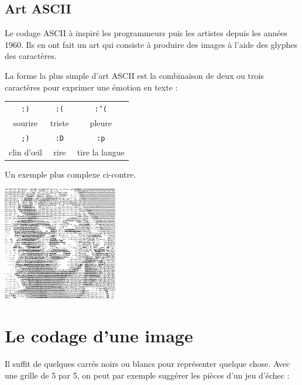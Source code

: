\documentclass[a4paper,10pt]{report}
\theoremstyle{exo}
\theoremstyle{exercice}
\begin{document}
\subsection{Art ASCII}
Le codage ASCII à inspiré les programmeurs puis les artistes depuis les années 1960. Ils en ont fait un art qui consiste à produire des images à l'aide des glyphes des caractères. 
\begin{multicols}{2}
La forme la plus simple d'art ASCII est la combinaison de deux ou trois caractères pour exprimer une émotion en texte : 

\begin{center}
\begin{tabular}{ccc}
\texttt{:)} & \texttt{:(} & \texttt{:'(} \\
sourire & triste & pleure \\
 \texttt{;)} & \texttt{:D} & \texttt{:p} \\
 clin d'œil  & rire & tire la langue \\
\end{tabular}
\end{center}

Un exemple plus complexe ci-contre.


\begin{center}
\includegraphics[height=5cm]{image/ASCII_Art_Marilyn_Monroe.png}
\end{center}
\end{multicols}
\section{Le codage d'une image}

Il suffit de quelques carrés noirs ou blancs pour représenter quelque chose. Avec une grille de 5 par 5, on peut par exemple suggérer les pièces d'un jeu d'échec :
\end{document}
